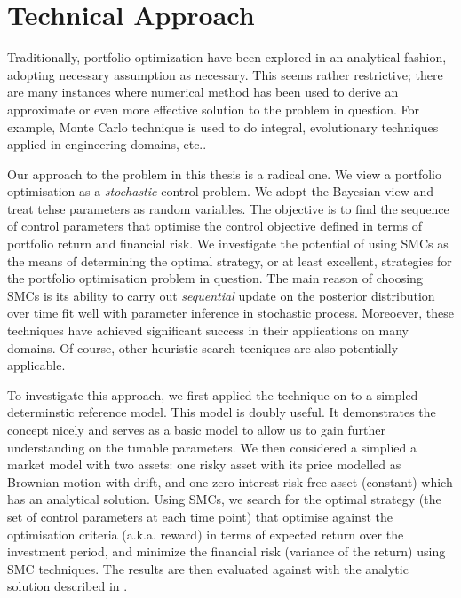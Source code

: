 \section{Technical Approach}
Traditionally, portfolio optimization have been explored in an analytical fashion, adopting necessary assumption as necessary. This seems rather restrictive; there are many instances where numerical method has been used to derive an approximate or even more effective solution to the problem in question. For example, Monte Carlo technique is used to do integral, evolutionary techniques applied in engineering domains, etc..

Our approach to the problem in this thesis is a radical one. We view a portfolio optimisation as a \emph{stochastic} control problem. We adopt the Bayesian view and treat tehse parameters as random variables. The objective is to find the sequence of control parameters that optimise the control objective defined in terms of portfolio return and financial risk. We investigate the potential of using SMCs as the means of determining the optimal strategy, or at least excellent, strategies for the portfolio optimisation problem in question. The main reason of choosing SMCs is its ability to carry out \emph{sequential} update on the posterior distribution over time fit well with parameter inference in stochastic process. Moreoever, these techniques have achieved significant success in their applications on many domains. Of course, other heuristic search tecniques are also potentially applicable.

To investigate this approach, we first applied the technique on to a simpled determinstic reference model. This model is doubly useful. It demonstrates the concept nicely and serves as a basic model to allow us to gain further understanding on the tunable parameters. We then considered a simplied a market model with two assets: one risky asset with its price modelled as Brownian motion with drift, and one zero interest risk-free asset (constant) which has an analytical solution. Using SMCs, we search for the optimal strategy (the set of control parameters at each time point) that optimise against the optimisation criteria (a.k.a. reward) in terms of expected return over the investment period, and minimize the financial risk (variance of the return) using SMC techniques. The results are then evaluated against with the analytic solution described in \cite{MF14}.

